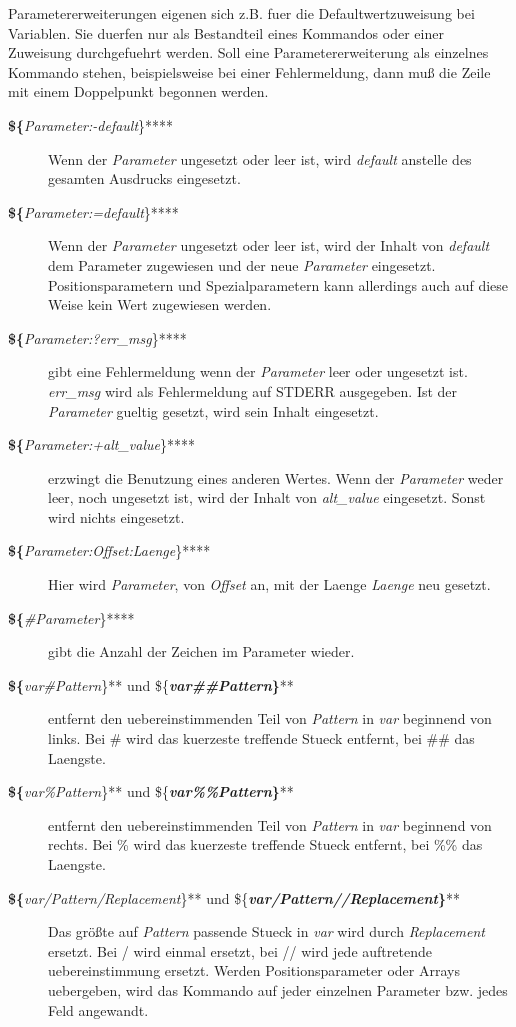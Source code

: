 \documentclass[12pt,]{article}
\begin{document}
Parametererweiterungen eigenen sich z.B. fuer die Defaultwertzuweisung
bei Variablen. Sie duerfen nur als Bestandteil eines Kommandos oder
einer Zuweisung durchgefuehrt werden. Soll eine Parametererweiterung als
einzelnes Kommando stehen, beispielsweise bei einer Fehlermeldung, dann
muß die Zeile mit einem Doppelpunkt begonnen werden.

\begin{description}
\item[\textbf{\$\{}\emph{Parameter:-default}\}****]
Wenn der \emph{Parameter} ungesetzt oder leer ist, wird \emph{default}
anstelle des gesamten Ausdrucks eingesetzt.
\item[\textbf{\$\{}\emph{Parameter:=default}\}****]
Wenn der \emph{Parameter} ungesetzt oder leer ist, wird der Inhalt von
\emph{default} dem Parameter zugewiesen und der neue \emph{Parameter}
eingesetzt. Positionsparametern und Spezialparametern kann allerdings
auch auf diese Weise kein Wert zugewiesen werden.
\item[\textbf{\$\{}\emph{Parameter:?err\_msg}\}****]
gibt eine Fehlermeldung wenn der \emph{Parameter} leer oder ungesetzt
ist. \emph{err\_msg} wird als Fehlermeldung auf STDERR ausgegeben. Ist
der \emph{Parameter} gueltig gesetzt, wird sein Inhalt eingesetzt.
\item[\textbf{\$\{}\emph{Parameter:+alt\_value}\}****]
erzwingt die Benutzung eines anderen Wertes. Wenn der \emph{Parameter}
weder leer, noch ungesetzt ist, wird der Inhalt von \emph{alt\_value}
eingesetzt. Sonst wird nichts eingesetzt.
\item[\textbf{\$\{}\emph{Parameter:Offset:Laenge}\}****]
Hier wird \emph{Parameter}, von \emph{Offset} an, mit der Laenge
\emph{Laenge} neu gesetzt.
\item[\textbf{\$\{}\emph{\#Parameter}\}****]
gibt die Anzahl der Zeichen im Parameter wieder.
\item[\textbf{\$\{}\emph{var\#Pattern}\}** und
\$\{\textbf{\emph{var\#\#Pattern}\}}**]
entfernt den uebereinstimmenden Teil von \emph{Pattern} in \emph{var}
beginnend von links. Bei \# wird das kuerzeste treffende Stueck
entfernt, bei \#\# das Laengste.
\item[\textbf{\$\{}\emph{var\%Pattern}\}** und
\$\{\textbf{\emph{var\%\%Pattern}\}}**]
entfernt den uebereinstimmenden Teil von \emph{Pattern} in \emph{var}
beginnend von rechts. Bei \% wird das kuerzeste treffende Stueck
entfernt, bei \%\% das Laengste.
\item[\textbf{\$\{}\emph{var/Pattern/Replacement}\}** und
\$\{\textbf{\emph{var/Pattern//Replacement}\}}**]
Das größte auf \emph{Pattern} passende Stueck in \emph{var} wird durch
\emph{Replacement} ersetzt. Bei / wird einmal ersetzt, bei // wird jede
auftretende uebereinstimmung ersetzt. Werden Positionsparameter oder
Arrays uebergeben, wird das Kommando auf jeder einzelnen Parameter bzw.
jedes Feld angewandt.


\end{description}
\end{document}
